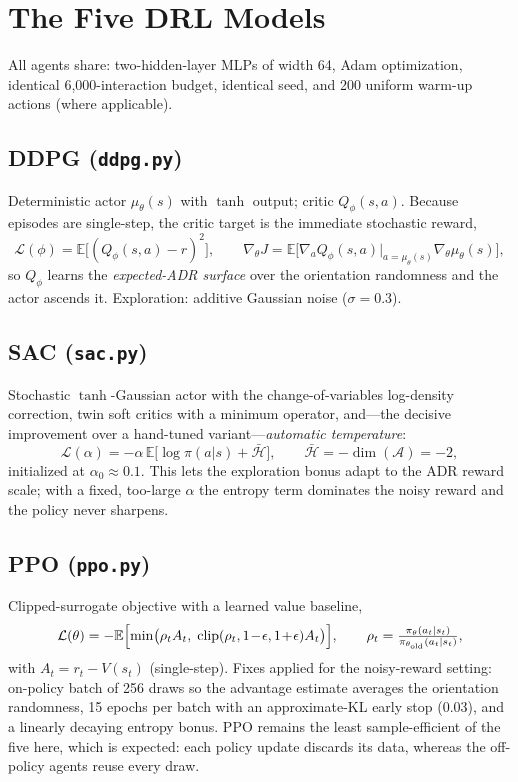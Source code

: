 \documentclass[11pt,a4paper]{article}
\newcommand{\E}{\mathbb{E}}
\begin{document}
\section{The Five DRL Models}

All agents share: two-hidden-layer MLPs of width 64, Adam optimization,
identical 6{,}000-interaction budget, identical seed, and 200 uniform
warm-up actions (where applicable).

\subsection{DDPG (\texttt{ddpg.py})}
Deterministic actor $\mu_\theta(s)$ with $\tanh$ output; critic
$Q_\phi(s,a)$. Because episodes are single-step, the critic target is the
immediate stochastic reward,
\begin{equation}
\mathcal L(\phi)=\E\bigl[(Q_\phi(s,a)-r)^2\bigr],\qquad
\nabla_\theta J=\E\bigl[\nabla_a Q_\phi(s,a)\big|_{a=\mu_\theta(s)}
\nabla_\theta\mu_\theta(s)\bigr],
\end{equation}
so $Q_\phi$ learns the \emph{expected-ADR surface} over the orientation
randomness and the actor ascends it. Exploration: additive Gaussian noise
($\sigma=0.3$).

\subsection{SAC (\texttt{sac.py})}
Stochastic $\tanh$-Gaussian actor with the change-of-variables log-density
correction, twin soft critics with a minimum operator, and---the decisive
improvement over a hand-tuned variant---\emph{automatic temperature}:
\begin{equation}
\mathcal L(\alpha)=-\alpha\,\E\bigl[\log\pi(a|s)+\bar{\mathcal H}\bigr],
\qquad \bar{\mathcal H}=-\dim(\mathcal A)=-2,
\end{equation}
initialized at $\alpha_0\approx0.1$. This lets the exploration bonus adapt to
the ADR reward scale; with a fixed, too-large $\alpha$ the entropy term
dominates the noisy reward and the policy never sharpens.

\subsection{PPO (\texttt{ppo.py})}
Clipped-surrogate objective with a learned value baseline,
\begin{equation}
\mathcal L(\theta)=-\E\Bigl[\min\bigl(\rho_t A_t,\;
\mathrm{clip}(\rho_t,1\!-\!\epsilon,1\!+\!\epsilon)A_t\bigr)\Bigr],
\qquad \rho_t=\tfrac{\pi_\theta(a_t|s_t)}{\pi_{\theta_{\mathrm{old}}}(a_t|s_t)},
\end{equation}
with $A_t=r_t-V(s_t)$ (single-step). Fixes applied for the noisy-reward
setting: on-policy batch of 256 draws so the advantage estimate averages the
orientation randomness, 15 epochs per batch with an approximate-KL early stop
(0.03), and a linearly decaying entropy bonus. PPO remains the least
sample-efficient of the five here, which is expected: each policy update
discards its data, whereas the off-policy agents reuse every draw.
\end{document}
